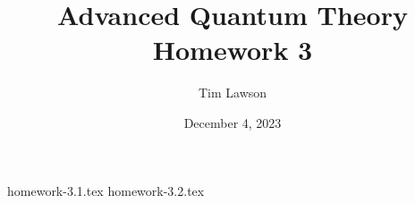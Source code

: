\documentclass[a4paper]{extarticle}
\title{Advanced Quantum Theory\\
\large Homework 3}
\author{Tim Lawson}
\date{December 4, 2023}
\begin{document}
\maketitle

{homework-3.1.tex}
{homework-3.2.tex}
\end{document}
